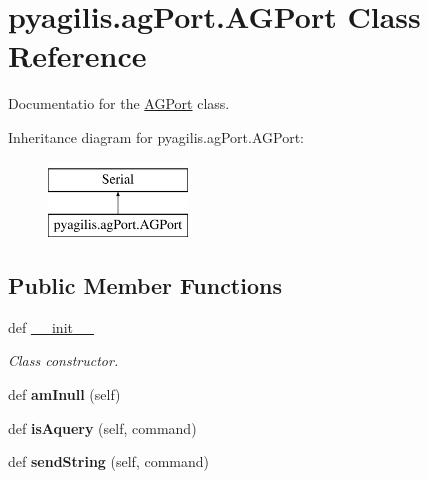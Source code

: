 \hypertarget{classpyagilis_1_1ag_port_1_1_a_g_port}{}\section{pyagilis.\+ag\+Port.\+A\+G\+Port Class Reference}
\label{classpyagilis_1_1ag_port_1_1_a_g_port}


Documentatio for the \hyperlink{classpyagilis_1_1ag_port_1_1_a_g_port}{A\+G\+Port} class.  


Inheritance diagram for pyagilis.\+ag\+Port.\+A\+G\+Port\+:\begin{figure}[H]
\begin{center}
\leavevmode
\includegraphics[height=2.000000cm]{classpyagilis_1_1ag_port_1_1_a_g_port}
\end{center}
\end{figure}
\subsection*{Public Member Functions}
\begin{DoxyCompactItemize}
\item 
def \hyperlink{classpyagilis_1_1ag_port_1_1_a_g_port_a82b3f965764f6ddbef5ebcc89e908f54}{\+\_\+\+\_\+init\+\_\+\+\_\+}
\begin{DoxyCompactList}\small\item\em Class constructor. \end{DoxyCompactList}\item 
\hypertarget{classpyagilis_1_1ag_port_1_1_a_g_port_ad854d770b84316549e659f7df1d06774}{}def {\bfseries am\+Inull} (self)\label{classpyagilis_1_1ag_port_1_1_a_g_port_ad854d770b84316549e659f7df1d06774}

\item 
\hypertarget{classpyagilis_1_1ag_port_1_1_a_g_port_ac953c8cc75fe959e4a34729cbd812509}{}def {\bfseries is\+Aquery} (self, command)\label{classpyagilis_1_1ag_port_1_1_a_g_port_ac953c8cc75fe959e4a34729cbd812509}

\item 
\hypertarget{classpyagilis_1_1ag_port_1_1_a_g_port_a819b6127c2b4eb7aaa16b51d49f51542}{}def {\bfseries send\+String} (self, command)\label{classpyagilis_1_1ag_port_1_1_a_g_port_a819b6127c2b4eb7aaa16b51d49f51542}

\end{DoxyCompactItemize}

